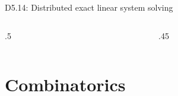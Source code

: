 \documentclass{beamer}
\begin{document}
\begin{frame}
\begin{block} {D5.14: Distributed exact linear system solving}
{\begin{columns}
\begin{column} {.5\textwidth}
\begin{center}
      \end{center}
      \end{column}
      \begin{column} {.45\textwidth}
        \begin{center}
        \end{center}
      \end{column}
    \end{columns}
}
  \end{block}
\end{frame}

\section{Combinatorics}
\end{document}
